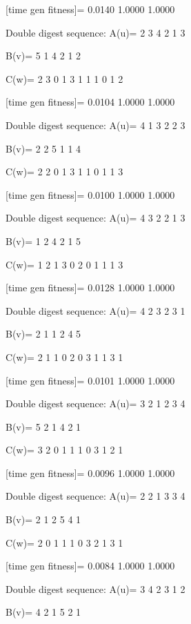 [time gen fitness]=
    0.0140    1.0000    1.0000

Double digest sequence:
A(u)=
     2     3     4     2     1     3

B(v)=
     5     1     4     2     1     2

C(w)=
     2     3     0     1     3     1     1     1     0     1     2

[time gen fitness]=
    0.0104    1.0000    1.0000

Double digest sequence:
A(u)=
     4     1     3     2     2     3

B(v)=
     2     2     5     1     1     4

C(w)=
     2     2     0     1     3     1     1     0     1     1     3

[time gen fitness]=
    0.0100    1.0000    1.0000

Double digest sequence:
A(u)=
     4     3     2     2     1     3

B(v)=
     1     2     4     2     1     5

C(w)=
     1     2     1     3     0     2     0     1     1     1     3

[time gen fitness]=
    0.0128    1.0000    1.0000

Double digest sequence:
A(u)=
     4     2     3     2     3     1

B(v)=
     2     1     1     2     4     5

C(w)=
     2     1     1     0     2     0     3     1     1     3     1

[time gen fitness]=
    0.0101    1.0000    1.0000

Double digest sequence:
A(u)=
     3     2     1     2     3     4

B(v)=
     5     2     1     4     2     1

C(w)=
     3     2     0     1     1     1     0     3     1     2     1

[time gen fitness]=
    0.0096    1.0000    1.0000

Double digest sequence:
A(u)=
     2     2     1     3     3     4

B(v)=
     2     1     2     5     4     1

C(w)=
     2     0     1     1     1     0     3     2     1     3     1

[time gen fitness]=
    0.0084    1.0000    1.0000

Double digest sequence:
A(u)=
     3     4     2     3     1     2

B(v)=
     4     2     1     5     2     1


